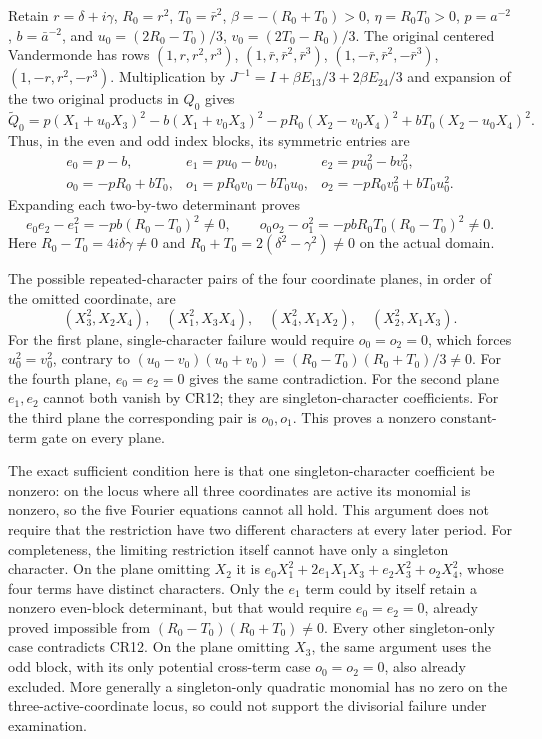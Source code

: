 Retain $r=\delta+i\gamma$, $R_0=r^2$, $T_0=\bar r^2$,
$\beta=-(R_0+T_0)>0$, $\eta=R_0T_0>0$, $p=a^{-2}$,
$b=\bar a^{-2}$, and
$u_0=(2R_0-T_0)/3$, $v_0=(2T_0-R_0)/3$.
The original centered Vandermonde has rows
$(1,r,r^2,r^3)$, $(1,\bar r,\bar r^2,\bar r^3)$,
$(1,-\bar r,\bar r^2,-\bar r^3)$,
$(1,-r,r^2,-r^3)$.  Multiplication by
$J^{-1}=I+\beta E_{13}/3+2\beta E_{24}/3$ and expansion of the
two original products in $Q_0$ gives
\[
 \widetilde Q_0=p(X_1+u_0X_3)^2-b(X_1+v_0X_3)^2
      -pR_0(X_2-v_0X_4)^2+bT_0(X_2-u_0X_4)^2.                   \tag{CR10}
\]
Thus, in the even and odd index blocks, its symmetric entries are
\[
 \begin{array}{lll}
 e_0=p-b,&e_1=pu_0-bv_0,&e_2=pu_0^2-bv_0^2,\\
 o_0=-pR_0+bT_0,&o_1=pR_0v_0-bT_0u_0,
                    &o_2=-pR_0v_0^2+bT_0u_0^2.
 \end{array}                                                     \tag{CR11}
\]
Expanding each two-by-two determinant proves
\[
 e_0e_2-e_1^2=-pb(R_0-T_0)^2\ne0,\qquad
 o_0o_2-o_1^2=-pbR_0T_0(R_0-T_0)^2\ne0.                         \tag{CR12}
\]
Here $R_0-T_0=4i\delta\gamma\ne0$ and
$R_0+T_0=2(\delta^2-\gamma^2)\ne0$ on the actual domain.

The possible repeated-character pairs of the four coordinate
planes, in order of the omitted coordinate, are
\[
 (X_3^2,X_2X_4),\quad (X_1^2,X_3X_4),\quad
 (X_4^2,X_1X_2),\quad (X_2^2,X_1X_3).
\]
For the first plane, single-character failure would require
$o_0=o_2=0$, which forces $u_0^2=v_0^2$, contrary to
$(u_0-v_0)(u_0+v_0)=(R_0-T_0)(R_0+T_0)/3\ne0$.
For the fourth plane, $e_0=e_2=0$ gives the same contradiction.
For the second plane $e_1,e_2$ cannot both vanish by CR12; they
are singleton-character coefficients.  For the third plane the
corresponding pair is $o_0,o_1$.  This proves a nonzero
constant-term gate on every plane.

The exact sufficient condition here is that one singleton-character
coefficient be nonzero: on the locus where all three coordinates are
active its monomial is nonzero, so the five Fourier equations cannot
all hold.  This argument does not require that the restriction have
two different characters at every later period.  For completeness,
the limiting restriction itself cannot have only a singleton character.
On the plane omitting $X_2$ it is
$e_0X_1^2+2e_1X_1X_3+e_2X_3^2+o_2X_4^2$, whose four terms have
distinct characters.  Only the $e_1$ term could by itself retain a
nonzero even-block determinant, but that would require
$e_0=e_2=0$, already proved impossible from
$(R_0-T_0)(R_0+T_0)\ne0$.  Every other singleton-only case
contradicts CR12.  On the plane omitting $X_3$, the same argument
uses the odd block, with its only potential cross-term case
$o_0=o_2=0$, also already excluded.  More generally a singleton-only
quadratic monomial has no zero on the three-active-coordinate locus,
so could not support the divisorial failure under examination.

